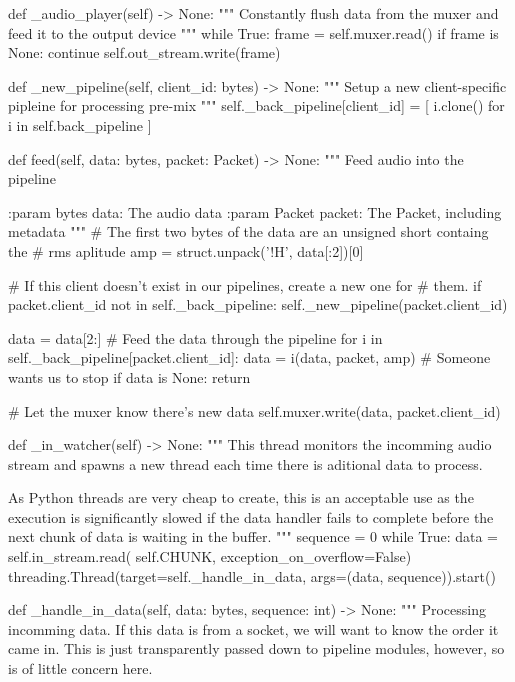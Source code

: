 \begin{pythoncode}
    def _audio_player(self) -> None:
        """
        Constantly flush data from the muxer and feed it to the output device
        """
        while True:
            frame = self.muxer.read()
            if frame is None:
                continue
            self.out_stream.write(frame)

    def _new_pipeline(self, client_id: bytes) -> None:
        """
        Setup a new client-specific pipleine for processing pre-mix
        """
        self._back_pipeline[client_id] = [
            i.clone() for i in self.back_pipeline
        ]

    def feed(self, data: bytes, packet: Packet) -> None:
        """
        Feed audio into the pipeline

        :param bytes data: The audio data
        :param Packet packet: The Packet, including metadata 
        """
        # The first two bytes of the data are an unsigned short containg the
        # rms aplitude
        amp = struct.unpack('!H', data[:2])[0]

        # If this client doesn't exist in our pipelines, create a new one for
        # them.
        if packet.client_id not in self._back_pipeline:
            self._new_pipeline(packet.client_id)

        data = data[2:]
        # Feed the data through the pipeline
        for i in self._back_pipeline[packet.client_id]:
            data = i(data, packet, amp)
            # Someone wants us to stop
            if data is None:
                return

        # Let the muxer know there's new data
        self.muxer.write(data, packet.client_id)

    def _in_watcher(self) -> None:
        """
        This thread monitors the incomming audio stream and spawns a new thread
        each time there is aditional data to process.

        As Python threads are very cheap to create, this is an acceptable use
        as the execution is significantly slowed if the data handler fails to
        complete before the next chunk of data is waiting in the buffer.
        """
        sequence = 0
        while True:
            data = self.in_stream.read(
                self.CHUNK, exception_on_overflow=False)
            threading.Thread(target=self._handle_in_data,
                             args=(data, sequence)).start()

    def _handle_in_data(self, data: bytes, sequence: int) -> None:
        """
        Processing incomming data.
        If this data is from a socket, we will want to know the order it came
        in. This is just transparently passed down to pipeline modules,
        however, so is of little concern here.


\end{pythoncode}
